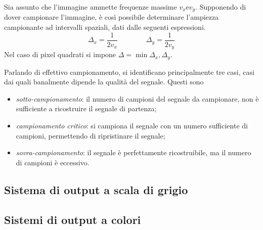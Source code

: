 \documentclass{subfiles}
\begin{document}
Sia assunto che l'immagine ammette frequenze massime \(v_{x} \text{e} v_{y}\).
Supponendo di dover campionare l'immagine, è così possibile determinare l'ampiezza campionante ad intervalli spaziali, dati dalle seguenti espressioni.
\[
    \Delta_{x} = \frac{1}{2v_{x}} \qquad \qquad \Delta_{y} = \frac{1}{2 v_{y}}
\]
\noindent Nel caso di pixel quadrati si impone \(\Delta = \min{\Delta_{x}, \Delta_{y}}\).

Parlando di effettivo campionamento, si identificano principalmente tre casi, casi dai quali banalmente dipende la qualità del segnale. Questi sono
\begin{itemize}
    \item \emph{sotto-campionamento}: il numero di campioni del segnale da campionare, non è sufficiente a ricostruire il segnale di partenza;
    \item \emph{campionamento critico}: si campiona il segnale con un numero sufficiente di campioni, permettendo di ripristinare il segnale;
    \item \emph{sovra-campionamento}: il segnale è perfettamente ricostruibile, ma il numero di campioni è eccessivo.
\end{itemize}

\subsection{Sistema di output a scala di grigio}


\subsection{Sistemi di output a colori}

\clearpage
\end{document}
